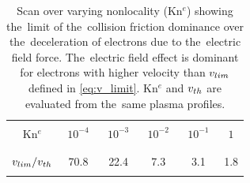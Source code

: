 \begin{table}
\begin{center}
  \begin{tabular}{c|ccccc}
    \hline\hline\\
    Kn$^e$ & $\,\,10^{-4}\,\,$ & $\,\,10^{-3}\,\,$ & $\,\,10^{-2}\,\,$ & $\,\,10^{-1}\,\,$ & $\,\,1\,\,$ \\\\
    \hline\\
    $v_{lim} / v_{th}$ & 70.8 & 22.4 & 7.3 & 3.1 & 1.8\\\\
    \hline\hline
  \end{tabular}
  \caption{
  Scan over varying nonlocality (Kn$^e$) showing the~limit of 
  the~collision friction dominance over the~deceleration of electrons 
  due to the~electric field force. The~electric field effect is dominant
  for electrons with higher velocity than $v_{lim}$ defined in 
  \eqref{eq:v_limit}. Kn$^e$ and $v_{th}$ are evaluated from the~same 
  plasma profiles.
  }
\label{tab:vlim}
\end{center}
\end{table}


 %

